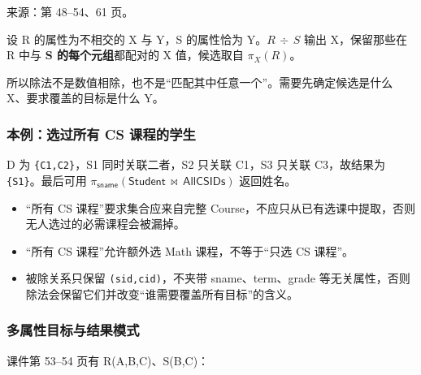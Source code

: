 
来源：第 48--54、61 页。

设 R 的属性为不相交的 X 与 Y，S 的属性恰为 Y。\(R\,\div \,S\) 输出 X，保留那些在 R 中与 \textbf{S 的每个元组}都配对的 X 值，候选取自 \(\pi _{X}(R)\)。


所以除法不是数值相除，也不是``匹配其中任意一个''。需要先确定候选是什么 X、要求覆盖的目标是什么 Y。

\subsubsection{本例：选过所有 CS 课程的学生}\label{05_relational_algebra_zh-ux672cux4f8bux9009ux8fc7ux6240ux6709-cs-ux8bfeux7a0bux7684ux5b66ux751f}


D 为 \texttt{\{C1,C2\}}，S1 同时关联二者，S2 只关联 C1，S3 只关联 C3，故结果为 \texttt{\{S1\}}。最后可用 \(\pi _{\mathsf{sname}}(\mathsf{Student}\,\bowtie \,\mathsf{AllCSIDs})\) 返回姓名。

\begin{itemize}
\tightlist
\item
  ``所有 CS 课程''要求集合应来自完整 Course，不应只从已有选课中提取，否则无人选过的必需课程会被漏掉。
\item
  ``所有 CS 课程''允许额外选 Math 课程，不等于``只选 CS 课程''。
\item
  被除关系只保留 \texttt{(\allowbreak{}sid,\allowbreak{}cid)\allowbreak{}}，不夹带 sname、term、grade 等无关属性，否则除法会保留它们并改变``谁需要覆盖所有目标''的含义。
\end{itemize}

\subsubsection{多属性目标与结果模式}\label{05_relational_algebra_zh-ux591aux5c5eux6027ux76eeux6807ux4e0eux7ed3ux679cux6a21ux5f0f}

课件第 53--54 页有 R(A,B,C)、S(B,C)：


